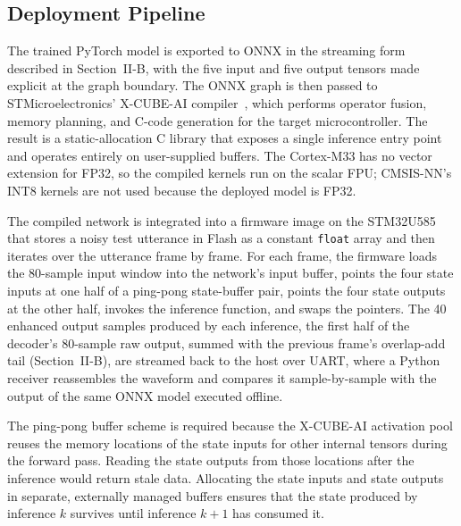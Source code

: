 \documentclass[conference]{IEEEtran}
\begin{document}
\subsection{Deployment Pipeline}

The trained PyTorch model is exported to ONNX in the streaming form described in Section~II-B, with the five input and five output tensors made explicit at the graph boundary. The ONNX graph is then passed to STMicroelectronics' X-CUBE-AI compiler~\cite{xcubeai}, which performs operator fusion, memory planning, and C-code generation for the target microcontroller. The result is a static-allocation C library that exposes a single inference entry point and operates entirely on user-supplied buffers. The Cortex-M33 has no vector extension for FP32, so the compiled kernels run on the scalar FPU; CMSIS-NN's INT8 kernels are not used because the deployed model is FP32.


The compiled network is integrated into a firmware image on the STM32U585 that stores a noisy test utterance in Flash as a constant \texttt{float} array and then iterates over the utterance frame by frame. For each frame, the firmware loads the 80-sample input window into the network's input buffer, points the four state inputs at one half of a ping-pong state-buffer pair, points the four state outputs at the other half, invokes the inference function, and swaps the pointers. The 40 enhanced output samples produced by each inference, the first half of the decoder's 80-sample raw output, summed with the previous frame's overlap-add tail (Section~II-B), are streamed back to the host over UART, where a Python receiver reassembles the waveform and compares it sample-by-sample with the output of the same ONNX model executed offline.


The ping-pong buffer scheme is required because the X-CUBE-AI activation pool reuses the memory locations of the state inputs for other internal tensors during the forward pass. Reading the state outputs from those locations after the inference would return stale data. Allocating the state inputs and state outputs in separate, externally managed buffers ensures that the state produced by inference $k$ survives until inference $k+1$ has consumed it.

\end{document}
